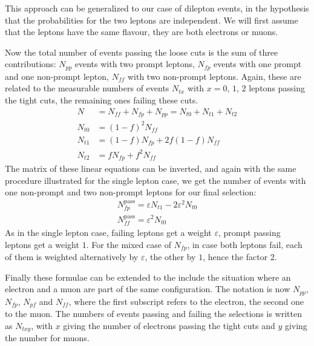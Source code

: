 This approach can be generalized to our case of dilepton events, 
in the hypothesis that the probabilities for the two leptons are independent. We will
first assume that the leptons have the same flavour, \ie they are both
electrons or muons.

Now the total number of events passing the loose cuts is the sum of three
contributions: $N_{pp}$ events with two prompt leptons, $N_{fp}$ events with
one prompt and one non-prompt lepton, $N_{ff}$ with two non-prompt leptons.
Again, these are related to the measurable numbers of events $N_{tx}$ with
 $x = 0$, $1$, $2$ leptons passing the tight cuts, the remaining ones
 failing these cuts.
\begin{align*}
    N &= N_{ff} + N_{fp} + N_{pp} = N_{t0} + N_{t1} + N_{t2}\\
    N_{t0} &= (1 - f)^2 N_{ff}\\
    N_{t1} &= (1 - f) N_{fp} + 2f(1 - f)N_{ff}\\
    N_{t2} &= fN_{fp} + f^2N_{ff}
\end{align*}
The matrix of these linear equations can be inverted, and again with the
same procedure illustrated for the single lepton case, we get the number of
events with one non-prompt and two non-prompt leptons for our final
selection:
\begin{align*}
    N_{fp}^\text{pass} = \varepsilon N_{t1} - 2 \varepsilon^{2} N_{t0}\\
    N_{ff}^\text{pass} = \varepsilon^2 N_{t0}
\end{align*}
As in the single lepton case, failing leptons get a weight $\varepsilon$,
prompt passing leptons get a weight $1$.
For the mixed case of $N_{fp}$, in case both leptons fail, each of them is
weighted alternatively by $\varepsilon$, the other by $1$, hence the factor
2. 

Finally these formulae can be extended to the include the situation where an
electron and a muon are part of the same configuration.
The notation is now $N_{pp}$, $N_{fp}$, $N_{pf}$ and $N_{ff}$, where the
first subscript refers to the electron, the second one to the muon. The
numbers of events passing and failing the selections is written as
$N_{txy}$, with $x$ giving the number of electrons passing the tight cuts
and $y$ giving the number for muons.

